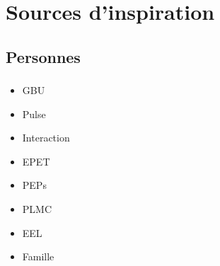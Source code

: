 \section{Sources d'inspiration}

\begin{frame}
\sectionFrame{}
\end{frame}

	\subsection{Personnes}
	
	\begin{frame}
	\frametitle{\insertsubsection}
	
		\begin{itemize}
		\item GBU %
		\item Pulse %
		\item Interaction %
		\item EPET %
		\item PEPs %
		\item PLMC
		\item EEL %
		\item Famille %
		\end{itemize}
	
	\end{frame}
	
		